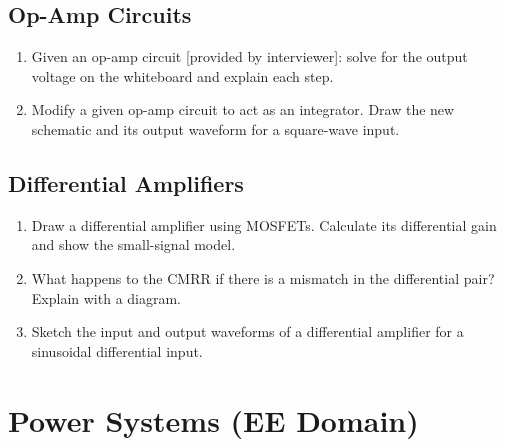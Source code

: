 \subsection{Op-Amp Circuits}

\begin{enumerate}[label=\textbf{A\arabic*.}, leftmargin=*, itemsep=6pt, start=9]

  \item Given an op-amp circuit [provided by interviewer]: solve for the output
        voltage on the whiteboard and explain each step.

  \item Modify a given op-amp circuit to act as an integrator. Draw the new
        schematic and its output waveform for a square-wave input.

\end{enumerate}

\subsection{Differential Amplifiers}

\begin{enumerate}[label=\textbf{A\arabic*.}, leftmargin=*, itemsep=6pt, start=11]

  \item Draw a differential amplifier using MOSFETs. Calculate its differential
        gain and show the small-signal model.

  \item What happens to the CMRR if there is a mismatch in the differential pair?
        Explain with a diagram.

  \item Sketch the input and output waveforms of a differential amplifier for a
        sinusoidal differential input.

\end{enumerate}

\section{Power Systems (EE Domain)}
\label{sec:iq-power}

